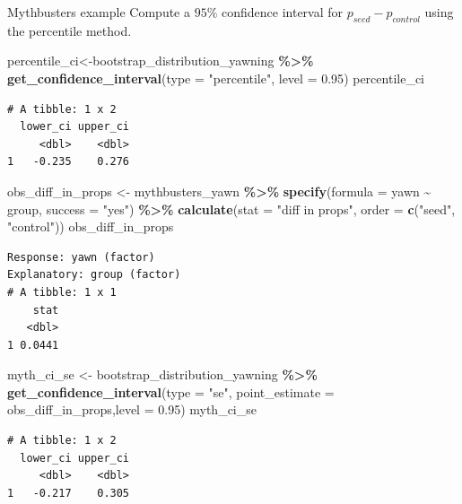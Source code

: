 \documentclass[
  ignorenonframetext,
]{beamer}
\newenvironment{Shaded}{\begin{snugshade}}{\end{snugshade}}
\newcommand{\AttributeTok}[1]{\textcolor[rgb]{0.13,0.29,0.53}{#1}}
\newcommand{\FloatTok}[1]{\textcolor[rgb]{0.00,0.00,0.81}{#1}}
\newcommand{\FunctionTok}[1]{\textcolor[rgb]{0.13,0.29,0.53}{\textbf{#1}}}
\newcommand{\NormalTok}[1]{#1}
\newcommand{\OtherTok}[1]{\textcolor[rgb]{0.56,0.35,0.01}{#1}}
\newcommand{\SpecialCharTok}[1]{\textcolor[rgb]{0.81,0.36,0.00}{\textbf{#1}}}
\newcommand{\StringTok}[1]{\textcolor[rgb]{0.31,0.60,0.02}{#1}}
\begin{document}
\begin{frame}[fragile]{Mythbusters example}
\label{mythbusters-example-3}
Compute a \(95\%\) confidence interval for \(p_{seed}-p_{control}\)
using the percentile method.

\tiny

\begin{Shaded}
\begin{Highlighting}[]
\NormalTok{percentile\_ci}\OtherTok{\textless{}{-}}\NormalTok{bootstrap\_distribution\_yawning }\SpecialCharTok{\%\textgreater{}\%} 
  \FunctionTok{get\_confidence\_interval}\NormalTok{(}\AttributeTok{type =} \StringTok{"percentile"}\NormalTok{, }\AttributeTok{level =} \FloatTok{0.95}\NormalTok{)}
\NormalTok{percentile\_ci}
\end{Highlighting}
\end{Shaded}

\begin{verbatim}
# A tibble: 1 x 2
  lower_ci upper_ci
     <dbl>    <dbl>
1   -0.235    0.276
\end{verbatim}

\begin{Shaded}
\begin{Highlighting}[]
\NormalTok{obs\_diff\_in\_props }\OtherTok{\textless{}{-}}\NormalTok{ mythbusters\_yawn }\SpecialCharTok{\%\textgreater{}\%} 
  \FunctionTok{specify}\NormalTok{(}\AttributeTok{formula =}\NormalTok{ yawn }\SpecialCharTok{\textasciitilde{}}\NormalTok{ group, }\AttributeTok{success =} \StringTok{"yes"}\NormalTok{) }\SpecialCharTok{\%\textgreater{}\%} 
  \FunctionTok{calculate}\NormalTok{(}\AttributeTok{stat =} \StringTok{"diff in props"}\NormalTok{, }\AttributeTok{order =} \FunctionTok{c}\NormalTok{(}\StringTok{"seed"}\NormalTok{, }\StringTok{"control"}\NormalTok{))}
\NormalTok{obs\_diff\_in\_props}
\end{Highlighting}
\end{Shaded}

\begin{verbatim}
Response: yawn (factor)
Explanatory: group (factor)
# A tibble: 1 x 1
    stat
   <dbl>
1 0.0441
\end{verbatim}

\begin{Shaded}
\begin{Highlighting}[]
\NormalTok{myth\_ci\_se }\OtherTok{\textless{}{-}}\NormalTok{ bootstrap\_distribution\_yawning }\SpecialCharTok{\%\textgreater{}\%} 
  \FunctionTok{get\_confidence\_interval}\NormalTok{(}\AttributeTok{type =} \StringTok{"se"}\NormalTok{, }\AttributeTok{point\_estimate =}\NormalTok{ obs\_diff\_in\_props,}\AttributeTok{level =} \FloatTok{0.95}\NormalTok{)}
\NormalTok{myth\_ci\_se}
\end{Highlighting}
\end{Shaded}

\begin{verbatim}
# A tibble: 1 x 2
  lower_ci upper_ci
     <dbl>    <dbl>
1   -0.217    0.305
\end{verbatim}

\normalsize
\end{frame}
\end{document}
